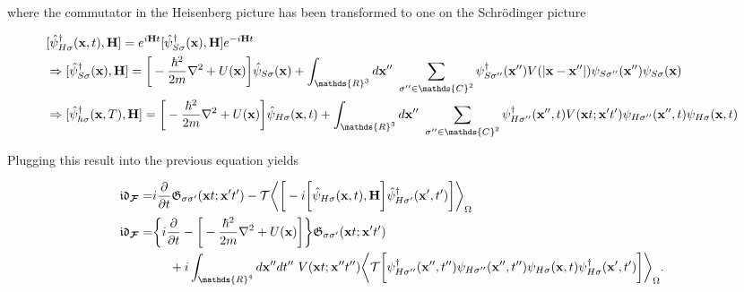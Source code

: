 \documentclass{homework}
\begin{document}
    where the commutator in the Heisenberg picture has been transformed to one on the Schr\"odinger picture 
    
    \begin{equation}
        \begin{split}
            & [\hat{\psi}^\dagger_{H \sigma}({\bf x}, t), {\bf H}] = e^{i{\bf H} t} [\hat{\psi}^\dagger_{ S \sigma}({\bf x}), {\bf H}] e^{-i{\bf H} t} \\
            & \Rightarrow [\hat{\psi}^\dagger_{ S \sigma}({\bf x}), {\bf H}] = \bigg[-\frac{\hbar^2}{2m} \nabla^2 + U({\bf x})\bigg] \hat{\psi}_{S \sigma}({\bf x})
            + \int_{\mathds{R}^3} d{\bf x}'' \blanky \sum_{\sigma'' \in \mathds{C}^2} \psi^\dagger_{S \sigma''}({\bf x}'') V(|{\bf x} - {\bf x}''|) \psi_{S \sigma''}({\bf x}'') \psi_{S \sigma}({\bf x}) \\
            & \Rightarrow [\hat{\psi}^\dagger_{ h \sigma}({\bf x}, T), {\bf H}] = \bigg[-\frac{\hbar^2}{2m} \nabla^2 + U({\bf x})\bigg] \hat{\psi}_{H \sigma}({\bf x}, t)
            + \int_{\mathds{R}^3} d{\bf x}'' \blanky \sum_{\sigma'' \in \mathds{C}^2} \psi^\dagger_{H \sigma''}({\bf x}'', t) V({\bf x}t; {\bf x}' t') \psi_{H \sigma''}({\bf x}'', t) \psi_{H \sigma}({\bf x}, t)
        \end{split}
    \end{equation}

Plugging this result into the previous equation yields

\begin{equation}
    \begin{split}
         \mathfrak{i}\mathfrak{d}_{\bm{\mathcal{F}}} = & i\frac{\partial}{\partial t} \mathfrak{G}_{\sigma \sigma'}({\bf x} t; {\bf x}' t') - \mathcal{T} \bigg\langle \bigg[-i \bigg[\hat{\psi}_{H \sigma}({\bf x}, t), {\bf H}\bigg] \hat{\psi}^\dagger_{H \sigma'}({\bf x}', t') \bigg] \bigg \rangle_{\Omega} \\
         \mathfrak{i}\mathfrak{d}_{\bm{\mathcal{F}}} = &\bigg\{ i\frac{\partial}{\partial t} - \bigg[-\frac{\hbar^2}{2m} \nabla^2 + U({\bf x})\bigg] \bigg\} \mathfrak{G}_{\sigma \sigma'}({\bf x} t; {\bf x}' t') \\
         & \blanky \blanky \blanky \blanky + i\int_{\mathds{R}^4} d{\bf x}'' dt'' \blanky V({\bf x}t; {\bf x}'' t'') \bigg\langle \mathcal{T} \bigg[ \psi^\dagger_{H \sigma''}({\bf x}'', t'') \psi_{H \sigma''}({\bf x}'', t'') \psi_{H \sigma}({\bf x}, t) \psi_{H \sigma}^\dagger({\bf x}', t') \bigg] \bigg \rangle_{\Omega}.
    \end{split}
    \label{NR_GF_Jellium_like_model}
\end{equation}
\end{document}
